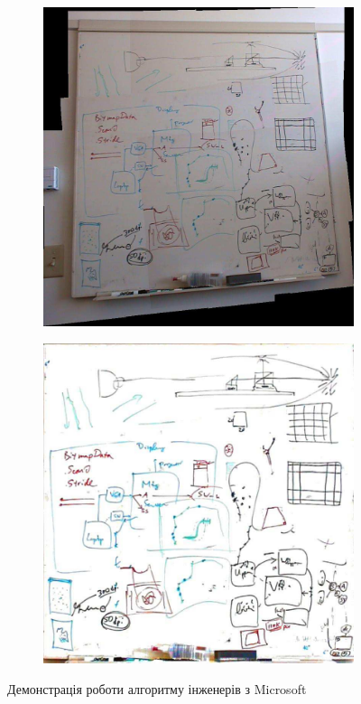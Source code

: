 \begin{figure}[h]
  \centering
  \begin{subfigure}[b]{0.4\textwidth}
    \centering
    \includegraphics[width=\textwidth]{images/zhang_2004_1}
  \end{subfigure}
  \begin{subfigure}[b]{0.3\textwidth}
    \centering
    \includegraphics[width=\textwidth]{images/zhang_2004_2}
  \end{subfigure}
  \label{fig:zhang:2004}
  \caption{Демонстрація роботи алгоритму інженерів з Microsoft}
\end{figure}

